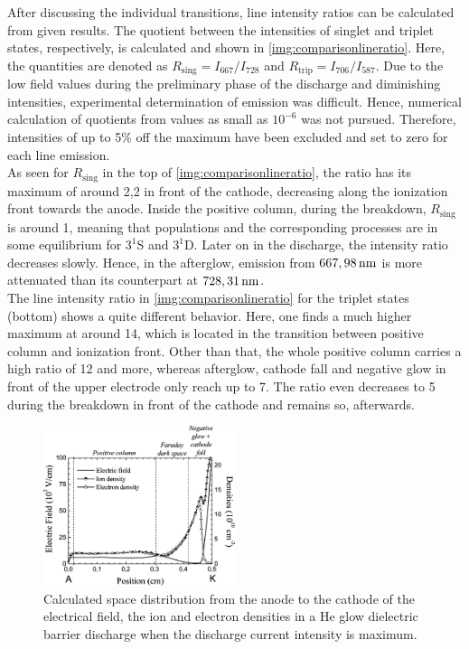\documentclass[a4paper,10pt,twoside]{article}
\newcommand{\tenpo}[1]{ 10^{#1}}
\newcommand{\ix}[1]{_\text{#1}}
\begin{document}
		After discussing the individual transitions, line intensity ratios can be calculated from given results. The quotient between the intensities of singlet and triplet states, respectively, is calculated and shown in \autoref{img:comparisonlineratio}. Here, the quantities are denoted as $R\ix{sing}=I\ix{667}/I\ix{728}$ and $R\ix{trip}=I\ix{706}/I\ix{587}$. Due to the low field values during the preliminary phase of the discharge and diminishing intensities, experimental determination of emission was difficult. Hence, numerical calculation of quotients from values as small as $\tenpo{-6}$ was not pursued. Therefore, intensities of up to 5\% off the maximum have been excluded and set to zero for each line emission.\\		
		As seen for $R\ix{sing}$ in the top of \autoref{img:comparisonlineratio}, the ratio has its maximum of around 2,2 in front of the cathode, decreasing along the ionization front towards the anode. Inside the positive column, during the breakdown, $R\ix{sing}$ is around 1, meaning that populations and the corresponding processes are in some equilibrium for $3^1$S and $3^1$D. Later on in the discharge, the intensity ratio decreases slowly. Hence, in the afterglow, emission from $\unit[667,98]{nm}$ is more attenuated than its counterpart at $\unit[728,31]{nm}$.\\
		The line intensity ratio in \autoref{img:comparisonlineratio} for the triplet states (bottom) shows a quite different behavior. Here, one finds a much higher maximum at around 14, which is located in the transition between positive column and ionization front. Other than that, the whole positive column carries a high ratio of 12 and more, whereas afterglow, cathode fall and negative glow in front of the upper electrode only reach up to 7. The ratio even decreases to 5 during the breakdown in front of the cathode and remains so, afterwards.
		
			\begin{figure}[t!]
				\centering
				\includegraphics[width=0.5\textwidth]{figures/lineratio/massinesp3fig5.pdf}
				\caption{Calculated space distribution from the anode to the cathode of	the electrical field, the ion and electron densities in a He glow dielectric barrier discharge when the discharge current intensity is maximum. \cite{Massines}}
				\label{img:massines}
			\end{figure}
		
\end{document}
